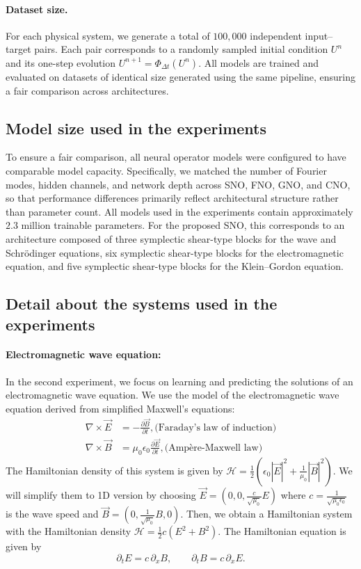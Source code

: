 \documentclass{article}
\theoremstyle{plain}
\theoremstyle{definition}
\theoremstyle{remark}
\begin{document}
\paragraph{Dataset size.}
For each physical system, we generate a total of $100{,}000$ independent
input--target pairs.
Each pair corresponds to a randomly sampled initial condition $U^n$ and its
one-step evolution $U^{n+1}=\Phi_{\Delta t}(U^n)$.
All models are trained and evaluated on datasets of identical size generated
using the same pipeline, ensuring a fair comparison across architectures.


\subsection{Model size used in the experiments}

To ensure a fair comparison, all neural operator models were configured to have
comparable model capacity.
Specifically, we matched the number of Fourier modes, hidden channels, and network depth
across SNO, FNO, GNO, and CNO, so that performance differences primarily reflect
architectural structure rather than parameter count.
All models used in the experiments contain approximately $2.3$ million trainable parameters.
For the proposed SNO, this corresponds to an architecture composed of three symplectic
shear-type blocks for the wave and Schr\"odinger equations, six symplectic shear-type
blocks for the electromagnetic equation, and five symplectic shear-type blocks for the
Klein--Gordon equation.

\subsection{Detail about the systems used in the experiments}
\paragraph{Electromagnetic wave equation:}
In the second experiment, we focus on learning and predicting the solutions of an electromagnetic wave equation.
We use the model of the electromagnetic wave equation derived from simplified Maxwell's equations:
\begin{align*}
    \nabla \times \vec{E} &= -\frac{\partial \vec{B}}{\partial t}, \text{(Faraday's law of induction)} \\
    \nabla \times \vec{B} &= \mu_0 \epsilon_0 \frac{\partial \vec{E}}{\partial t}, \text{(Ampère-Maxwell law)}
\end{align*}
The Hamiltonian density of this system is given by 
$
\mathcal{H} = \frac{1}{2}\left(\epsilon_0|\vec{E}|^2+\frac{1}{\mu_0}|\vec{B}|^2\right).
$
We will simplify them to 1D version by choosing 
$\vec{E}=(0,0,\frac{c}{\sqrt{\mu_0}}E)$ where $c = \frac{1}{\sqrt{\mu_0 \epsilon_0}}$ is the wave speed and
$\vec{B}=(0,\frac{1}{\sqrt{\mu_0}}B,0)$. Then, we obtain a Hamiltonian system with the Hamiltonian density $\mathcal{H}=\frac{1}{2}c(E^2+B^2)$. The Hamiltonian equation is given by
$$
\partial_t E = c\,\partial_x B,
\qquad
\partial_t B = c\,\partial_x E.
$$
\end{document}
